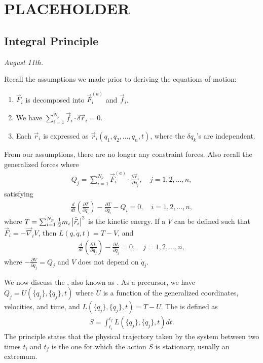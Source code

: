 \chapter{PLACEHOLDER}

\section{Integral Principle}
\textit{August 11th.}

Recall the assumptions we made prior to deriving the equations of motion:
\begin{enumerate}
    \item $\vec{F}_{i}$ is decomposed into $\vec{F}_{i}^{(a)}$ and $\vec{f}_{i}$.
    \item We have $\sum_{i=1}^{N_{p}} \vec{f}_{i} \cdot \delta \vec{r}_{i} = 0$.
    \item Each $\vec{r}_{i}$ is expressed as $\vec{r}_{i}(q_{1},q_{2},\ldots,q_{n},t)$, where the $\delta q_{k}$'s are independent.
\end{enumerate}

From our assumptions, there are no longer any constraint forces. Also recall the generalized forces where
\begin{align}
    Q_{j} = \sum_{i=1}^{N_{p}} \vec{F}_{i}^{(a)} \cdot \frac{\partial \vec{r}_{i}}{\partial q_{j}}, \quad j = 1,2,\ldots,n,
\end{align}
satisfying
\begin{align}
    \frac{d}{dt} \left( \frac{\partial T}{\partial \dot{q}_{i}} \right) - \frac{\partial T}{\partial q_{i}} - Q_{i} = 0, \quad i = 1,2,\ldots,n,
\end{align}
where $T = \sum_{i=1}^{N_{p}} \frac{1}{2} m_{i} \left| \dot{\vec{r}}_{i} \right|^{2}$ is the kinetic energy. If a $V$ can be defined such that $\vec{F}_{i} = -\vec{\nabla}_{i} V$, then $L(q,\dot{q},t) = T - V$, and
\begin{align}
    \frac{d}{dt} \left( \frac{\partial L}{\partial \dot{q}_{j}} \right) - \frac{\partial L}{\partial q_{j}} = 0, \quad j = 1,2,\ldots,n,
\end{align}
where $-\frac{\partial V}{\partial q_{j}} = Q_{j}$ and $V$ does not depend on $\dot{q}_{j}$.

We now discuss the , also known as . As a precursor, we have $Q_{j} = U(\{q_{j}\},\{\dot{q}_{j}\},t)$ where $U$ is a function of the generalized coordinates, velocities, and time, and $L(\{q_{j}\},\{\dot{q}_{j}\},t) = T-U$. The  is defined as
\begin{align}
    S = \int_{t_{i}}^{t_{f}} L(\{q_{j}\},\{\dot{q}_{j}\},t)dt.
\end{align}
The principle states that the physical trajectory taken by the system between two times $t_{i}$ and $t_{f}$ is the one for which the action $S$ is stationary, usually an extremum.

